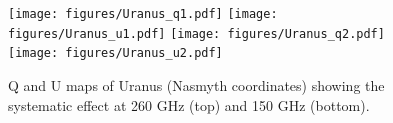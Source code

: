 \documentclass[twocolumn,traditabstract]{aa}
\begin{document}



  

\begin{figure}
  \begin{center}
  \texttt{[image: figures/Uranus\_q1.pdf]}
   \texttt{[image: figures/Uranus\_u1.pdf]}
    \texttt{[image: figures/Uranus\_q2.pdf]}
   \texttt{[image: figures/Uranus\_u2.pdf]}
  \caption{ Q and U maps of Uranus (Nasmyth coordinates) showing the systematic effect at 260 GHz (top) and 150 GHz (bottom). }
  \label{uranus}
  \end{center}
  \end{figure}
\end{document}
